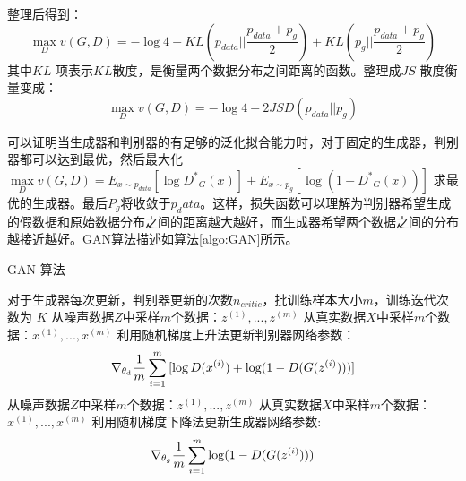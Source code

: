 整理后得到：
\begin{equation}
\label{eq:37}
\mathop {\max }\limits_D v(G,D) =  - \log 4 + KL({p_{data}}||\frac{{{p_{data}} + {p_g}}}{2}) + KL({p_g}||\frac{{{p_{data}} + {p_g}}}{2})
\end{equation}
其中$KL$ 项表示$KL$散度\cite{joyce2011kullback}，是衡量两个数据分布之间距离的函数。整理成$ JS $ 散度衡量变成：
\begin{equation}
\label{eq:38}
\mathop {\max }\limits_D v(G,D) =  - \log 4 + 2JSD({p_{data}}||{p_g})
\end{equation}

可以证明当生成器和判别器的有足够的泛化拟合能力时，对于固定的生成器，判别器都可以达到最优，然后最大化$\mathop {\max }\limits_D v(G,D) = {E_{x \sim {p_{data}}}}[\log {D^*}_G(x)] + {E_{x \sim {p_g}}}[\log (1 - {D^*}_G(x))]$ 求最优的生成器。最后$P_g$将收敛于$p_data$。这样，损失函数可以理解为判别器希望生成的假数据和原始数据分布之间的距离越大越好，而生成器希望两个数据之间的分布越接近越好。GAN算法描述如算法\ref{algo:GAN}所示。

%
%

\begin{algorithm}[htpb]
	\caption{GAN 算法}%
	\label{algo:GAN}
	\begin{algorithmic}[1]%
		\Require
		对于生成器每次更新，判别器更新的次数$n_{critic}$，批训练样本大小$m$，训练迭代次数为 $K$
		\State 从噪声数据$Z$中采样$m$个数据：${z^{(1)},...,z^{(m)}}$
		\State
		从真实数据$X$中采样$m$个数据：${x^{(1)},...,x^{(m)}}$ 
		\State 利用随机梯度上升法更新判别器网络参数：
		\begin{equation*}
			{\nabla _{{\theta _{\rm{d}}}}}\frac{{\rm{1}}}{m}\sum\limits_{i = 1}^m {[\log D({x^{(i)}}) + \log (1 - D(G({z^{(i)}})))]} 
		\end{equation*}
		\EndFor
		\State 从噪声数据$Z$中采样$m$个数据：${z^{(1)},...,z^{(m)}}$
		\State
		从真实数据$X$中采样$m$个数据：${x^{(1)},...,x^{(m)}}$ 
		\State 利用随机梯度下降法更新生成器网络参数:
		\begin{equation*}
		{\nabla _{{\theta _g}}}\frac{{\rm{1}}}{m}\sum\limits_{i = 1}^m {\log (1 - D(G({z^{(i)}})))}
		\end{equation*}
		\EndFor
	\end{algorithmic}
\end{algorithm}

